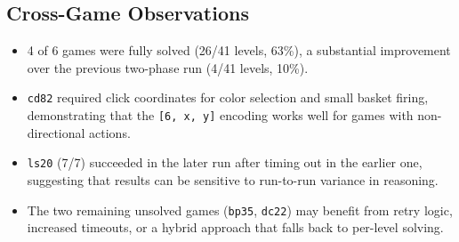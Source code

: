 \documentclass{article}
\begin{document}
\subsection{Cross-Game Observations}
\begin{itemize}
  \item 4 of 6 games were fully solved (26/41 levels, 63\%), a substantial improvement over the previous two-phase run (4/41 levels, 10\%).
  \item \texttt{cd82} required click coordinates for color selection and small basket firing, demonstrating that the \texttt{[6, x, y]} encoding works well for games with non-directional actions.
  \item \texttt{ls20} (7/7) succeeded in the later run after timing out in the earlier one, suggesting that results can be sensitive to run-to-run variance in reasoning.
  \item The two remaining unsolved games (\texttt{bp35}, \texttt{dc22}) may benefit from retry logic, increased timeouts, or a hybrid approach that falls back to per-level solving.
\end{itemize}
\end{document}

